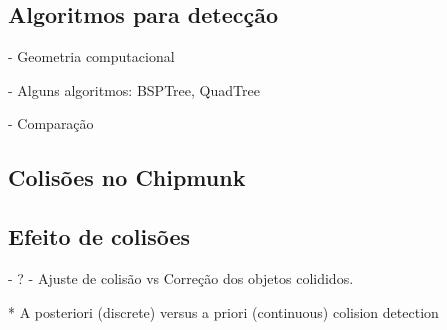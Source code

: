 \subsection{Algoritmos para detecção}
               - Geometria computacional

                - Alguns algoritmos: BSPTree, QuadTree

                - Comparação
\subsection{Colisões no Chipmunk} 


\subsection{Efeito de colisões}
		- ?
         - Ajuste de colisão vs Correção dos objetos colididos.

        * A posteriori (discrete) versus a priori (continuous) colision detection

